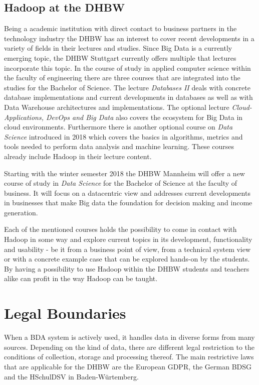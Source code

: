 \subsection{Hadoop at the DHBW}

Being a academic institution with direct contact to 
business partners in the technology industry the \ac{DHBW} has an interest to cover recent developments in a variety of fields in their lectures and studies.
Since Big Data is a currently emerging topic,
the \ac{DHBW} Stuttgart currently offers multiple that lectures incorporate this topic.
In the course of study in applied computer science within the faculty of engineering there are three courses that are integrated into the studies for the Bachelor of Science.
The lecture \emph{Databases II} deals with concrete database implementations and current developments in databases as well as with Data Warehouse architectures and implementations.
\autocite[][]{DHBW2017aidbii}
The optional lecture \emph{Cloud-Applications, DevOps and Big Data} also covers the ecosystem for Big Data in cloud environments. \autocite[][]{DHBW2017aiwf}
Furthermore there is another optional course on \emph{Data Science} introduced in 2018 which covers the basics in algorithms, metrics and tools needed to perform data analysis and machine learning.
These courses already include Hadoop in their lecture content.

Starting with the winter semester 2018 the \ac{DHBW} Mannheim will offer a new course of study in \emph{Data Science} for the Bachelor of Science at the faculty of business.
It will focus on a datacentric view and addresses current developments in businesses that make Big data the foundation for decision making and income generation.
\autocite[][]{DHBW2018mannheimdatascience}

Each of the mentioned courses holds the possibility to come in contact with Hadoop in some way and explore current topics in its development, functionality and usability - be it from a business point of view, from a technical system view or with a concrete example case that can be explored hands-on by the students.
By having a possibility to use Hadoop within the \ac{DHBW} students and teachers alike can profit in the way Hadoop can be taught.

\section{Legal Boundaries}
\label{sec:fund:legal}

When a \ac{BDA} system is actively used, it handles data in diverse forms from many sources.
Depending on the kind of data, there are different legal restriction 
to the conditions of collection, storage and processing thereof.
The main restrictive laws that are applicable for the \ac{DHBW} are the European \ac{GDPR}, the German \ac{BDSG} and the \ac{HSchulDSV} in Baden-Würtemberg.

